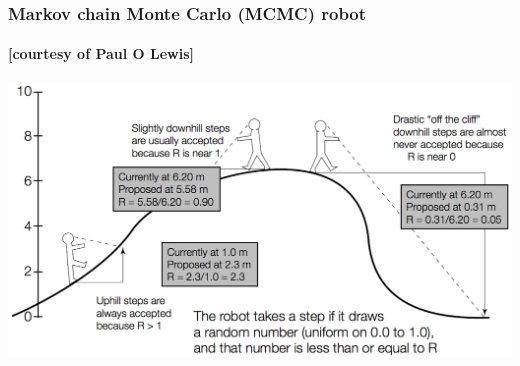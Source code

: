 \begin{frame}
\frametitle{Markov chain Monte Carlo (MCMC) robot}
\framesubtitle{[courtesy of Paul O Lewis]}

\includegraphics[width=\textwidth]{../images/mcmcRobot2}

\end{frame}

